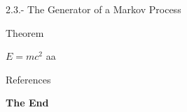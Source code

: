 \documentclass[aspectratio=169,xcolor=dvipsnames]{beamer}
\begin{document}
\begin{frame}
    \centering
    \Huge{2.3.- The Generator of a Markov Process}
\end{frame}


\begin{frame}{Theorem}
    \begin{theorem}
        $E = mc^2$ aa
    \end{theorem}
\end{frame}

\begin{frame}{References}
    \footnotesize
    
    
\end{frame}


\begin{frame}
    \Huge{\centerline{\textbf{The End}}}
\end{frame}

\end{document}
